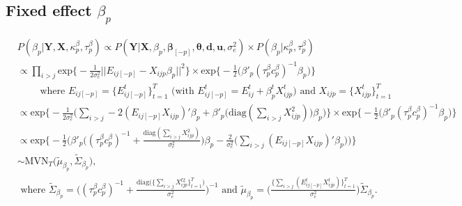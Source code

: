 \documentclass[a4paper]{article}
\begin{document}
\subsection{Fixed effect $\beta_p$} 
			\begin{equation}
			\begin{aligned}
			&P(\beta_p|\mathbf{Y}, \mathbf{X}, \kappa^\beta_p, \tau^\beta_p) \propto P(\mathbf{Y}|\mathbf{X}, \beta_p, \boldsymbol{\beta}_{[-p]}, \boldsymbol{\theta}, \boldsymbol{d}, \boldsymbol{u},\sigma_e^2) \times P(\beta_p|\kappa^\beta_p, \tau^\beta_p) \\
			&\propto\prod\limits_{i>j}\mbox{exp}\Big\{-\frac{1}{2\sigma_e^2}||E_{ij[-p]}-X_{ijp}\beta_p||^2\Big\}\times \mbox{exp}\Big\{-\frac{1}{2}\big(\beta'_p(\tau^{\beta}_pc^\beta_p)^{-1}\beta_p\big)\Big\} \\ &\quad\quad\mbox{ where } E_{ij[-p]} = \{E^t_{ij[-p]}\}_{t=1}^T \mbox{ (with }E^{t}_{ij[-p]}=E^t_{ij}+\beta^t_{p}X^{t}_{ijp})\mbox{ and } X_{ijp} = \{X^t_{ijp}\}_{t=1}^T\\
			&\propto\mbox{exp}\Big\{-\frac{1}{2\sigma_e^2}\Big(\sum\limits_{i>j}-2(E_{ij[-p]}X_{ijp})'\beta_p+\beta'_p\big(\mbox{diag}(\sum\limits_{i>j}{X^2_{ijp}})\big)\beta_p\Big)\Big\}\times \mbox{exp}\Big\{-\frac{1}{2}\big(\beta'_p(\tau^{\beta}_pc^\beta_p)^{-1}\beta_p\big)\Big\}\\
			&\propto\mbox{exp}\Big\{-\frac{1}{2}\Big(\beta'_p\big((\tau^{\beta}_pc^\beta_p)^{-1}+\frac{\mbox{diag}(\sum_{i>j}{X^2_{ijp}})}{\sigma_e^2}\big)\beta_p-\frac{2}{\sigma_e^2}\big(\sum_{i>j}(E_{ij[-p]}X_{ijp})'\beta_p\big)\Big)\Big\}\\
			& \sim \mbox{MVN}_T\big(\tilde{\mu}_{\beta_p}, \tilde{\Sigma}_{\beta_p} \big),\\
		&\mbox{ where } \tilde{\Sigma}_{\beta_p} = \Big((\tau^{\beta}_pc^\beta_p)^{-1}+\frac{\mbox{diag}\big(\{\sum_{i>j}{X^{t2}_{ijp}}\}_{t=1}^{T}\big)}{\sigma_e^2}\Big)^{-1} \mbox{ and } \tilde{\mu}_{\beta_p} =  \Big(\frac{\{\sum_{i>j}(E^{t}_{ij[-p]}X^t_{ijp})\}_{t=1}^{T}}{\sigma_e^2}\Big)\tilde{\Sigma}_{\beta_p}.
			\end{aligned}
			\end{equation} 
\end{document}
